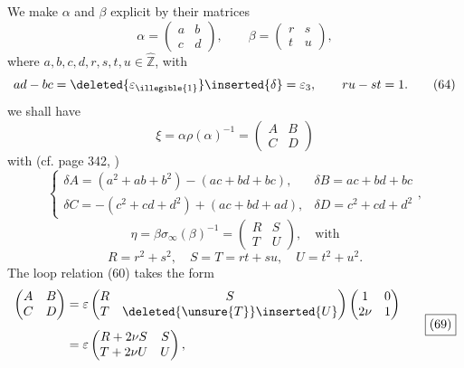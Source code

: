 We make $\alpha$ and $\beta$ explicit by their matrices
\[
\alpha=\begin{pmatrix}a&b\\c&d\end{pmatrix},\qquad
\beta=\begin{pmatrix}r&s\\t&u\end{pmatrix},
\tag{63}
\]
where $a,b,c,d,r,s,t,u\in\widehat{\mathbb Z}$, with
\[
ad-bc=\deleted{\varepsilon_{\illegible{1}}}\inserted{\delta}=\varepsilon_3,\qquad ru-st=1.
\tag{64}
\]
we shall have
\[
\xi=\alpha\rho(\alpha)^{-1}=\begin{pmatrix}A&B\\C&D\end{pmatrix}
\tag{65}
\]
with (cf. page 342, )
\[
\left\{\begin{array}{ll}
\delta A=(a^2+ab+b^2)-(ac+bd+bc),&\delta B=ac+bd+bc\\[4pt]
\delta C=-(c^2+cd+d^2)+(ac+bd+ad),&\delta D=c^2+cd+d^2
\end{array}\right.,
\tag{66}
\]
\[
\eta=\beta\sigma_\infty(\beta)^{-1}=\begin{pmatrix}R&S\\T&U\end{pmatrix},\quad\text{with}
\tag{67}
\]
\[
R=r^2+s^2,\quad S=T=rt+su,\quad U=t^2+u^2.
\tag{68}
\]
The loop relation (60) takes the form
\[
\begin{aligned}
\begin{pmatrix}A&B\\C&D\end{pmatrix}
&=\varepsilon\begin{pmatrix}R&S\\T&\deleted{\unsure{T}}\inserted{U}\end{pmatrix}
\begin{pmatrix}1&0\\2\nu&1\end{pmatrix}\\[4pt]
&=\varepsilon\begin{pmatrix}R+2\nu S&S\\T+2\nu U&U\end{pmatrix},
\end{aligned}
\tag*{\boxed{(69)}}
\]



